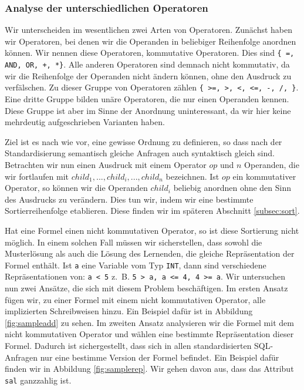 \subsubsection{Analyse der unterschiedlichen Operatoren}

Wir unterscheiden im wesentlichen zwei Arten von Operatoren. Zunächst haben wir Operatoren, bei denen wir die Operanden in beliebiger Reihenfolge anordnen können. Wir nennen diese Operatoren, kommutative Operatoren. Dies sind \verb|{ =, AND, OR, +, *}|. Alle anderen Operatoren sind demnach nicht kommutativ, da wir die Reihenfolge der Operanden nicht ändern können, ohne den Ausdruck zu verfälschen. Zu dieser Gruppe von Operatoren zählen \verb|{ >=, >, <, <=, -, /, }|. Eine dritte Gruppe bilden unäre Operatoren, die nur einen Operanden kennen. Diese Gruppe ist aber im Sinne der Anordnung uninteressant, da wir hier keine mehrdeutig aufgeschrieben Varianten haben.

Ziel ist es nach wie vor, eine gewisse Ordnung zu definieren, so dass nach der Standardisierung semantisch gleiche Anfragen auch syntaktisch gleich sind. Betrachten wir nun einen Ausdruck mit einem Operator $op$ und $n$ Operanden, die wir fortlaufen mit $\mathit{child_1},...,\mathit{child_i},...,\mathit{child_n}$ bezeichnen. Ist $op$ ein kommutativer Operator, so können wir die Operanden $child_i$ beliebig anordnen ohne den Sinn des Ausdrucks zu verändern. Dies tun wir, indem wir eine bestimmte Sortierreihenfolge etablieren. Diese finden wir im späteren Abschnitt \ref{subsec:sort}.

Hat eine Formel einen nicht kommutativen Operator, so ist diese Sortierung nicht möglich. In einem solchen Fall müssen wir sicherstellen, dass sowohl die Musterlösung als auch die Lösung des Lernenden, die gleiche Repräsentation der Formel enthält. Ist \verb|a| eine Variable vom Typ \verb|INT|, dann sind verschiedene Repräsentationen von: \verb|a < 5| \mbox{z. B.} \verb|5 > a, a <= 4, 4 >= a|. Wir untersuchen nun zwei Ansätze, die sich mit diesem Problem beschäftigen. Im ersten Ansatz fügen wir, zu einer Formel mit einem nicht kommutativen Operator, alle implizierten Schreibweisen hinzu. Ein Beispiel dafür ist in Abbildung \ref{fig:sampleadd} zu sehen. Im zweiten Ansatz analysieren wir die Formel mit dem nicht kommutativen Operator und wählen eine bestimmte Repräsentation dieser Formel. Dadurch ist sichergestellt, dass sich in allen standardisierten SQL-Anfragen nur eine bestimme Version der Formel befindet. Ein Beispiel dafür finden wir in Abbildung \ref{fig:samplerep}. Wir gehen davon aus, dass das Attribut \verb|sal| ganzzahlig ist.

